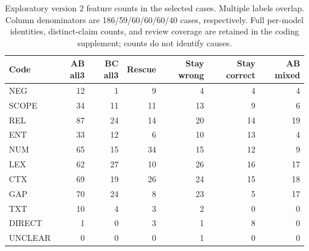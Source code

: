 \begin{table}[htbp]\centering\small
\caption{Exploratory version 2 feature counts in the selected cases. Multiple labels overlap. Column denominators are 186/59/60/60/60/40 cases, respectively. Full per-model identities, distinct-claim counts, and review coverage are retained in the coding supplement; counts do not identify causes.}\label{tab:features}
\begin{tabularx}{\linewidth}{Xrrrrrr}\toprule
Code & AB all3 & BC all3 & Rescue & Stay wrong & Stay correct & AB mixed \\\midrule
NEG & 12 & 1 & 9 & 4 & 4 & 4 \\
SCOPE & 34 & 11 & 11 & 13 & 9 & 6 \\
REL & 87 & 24 & 14 & 20 & 14 & 19 \\
ENT & 33 & 12 & 6 & 10 & 13 & 4 \\
NUM & 65 & 15 & 34 & 15 & 12 & 9 \\
LEX & 62 & 27 & 10 & 26 & 16 & 17 \\
CTX & 69 & 19 & 26 & 24 & 15 & 18 \\
GAP & 70 & 24 & 8 & 23 & 5 & 17 \\
TXT & 10 & 4 & 3 & 2 & 0 & 0 \\
DIRECT & 1 & 0 & 3 & 1 & 8 & 0 \\
UNCLEAR & 0 & 0 & 0 & 1 & 0 & 0 \\
\bottomrule
\end{tabularx}
\end{table}